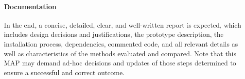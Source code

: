 \paragraph{Documentation} In the end, a concise, detailed, clear, and well-written report is expected, which includes design decisions and justifications, the prototype description, the installation process, dependencies, commented code, and all relevant details as well as characteristics of the methods evaluated and compared. Note that this MAP may demand ad-hoc decisions and updates of those steps determined to ensure a successful and correct outcome.
